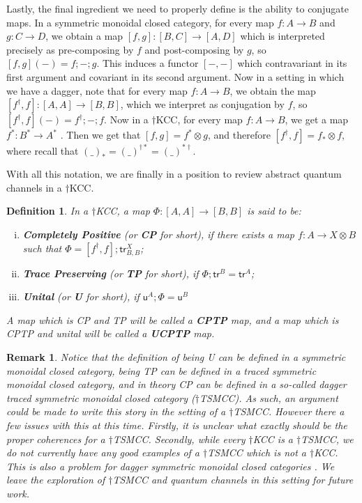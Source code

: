 \documentclass[submission,copyright,creativecommons]{eptcs}
\newtheorem{definition}[observation]{Definition}
\newtheorem{remark}[observation]{Remark}
\begin{document}
Lastly, the final ingredient we need to properly define is the ability to conjugate maps. In a symmetric monoidal closed category, for every map $f: A \to B$ and $g: C \to D$, we obtain a map $[f,g]: [B,C] \to [A,D]$ which is interpreted precisely as pre-composing by $f$ and post-composing by $g$, so $[f,g](-) = f;-;g$. This induces a functor $[-,-]$ which contravariant in its first argument and covariant in its second argument. Now in a setting in which we have a dagger, note that for every map $f: A\to B$, we obtain the map $[f^\dagger, f]: [A,A] \to [B,B]$, which we interpret as conjugation by $f$, so $[f^\dagger, f](-) = f^\dagger; -; f$. Now in a $\dagger$KCC, for every map $f: A \to B$, we get a map $f^\ast: B^\ast \to A^\ast$ \cite[Ex 4.4]{selinger2010survey}. Then we get that $[f,g] = f^\ast \otimes g$, and therefore $[f^\dagger, f] = f_\ast \otimes f$, where recall that $(\_)_\ast = (\_)^{\dagger\ast} = (\_)^{\ast\dagger}$. 

With all this notation, we are finally in a position to review abstract quantum channels in a $\dagger$KCC. 

\begin{definition}\label{Def:UCPTP} In a $\dagger$KCC, a map $\Phi: [A,A] \to [B,B]$ is said to be:
  \begin{enumerate}[(i)]
\item \label{def:CP}\textbf{Completely Positive} \cite[Cor 4.13]{selinger2007dagger} (or \textbf{CP} for short), if there exists a map $f: A \to X \otimes B$ such that $\Phi = [f^\dagger, f]; \mathsf{tr}^X_{B,B}$; 
\item \label{def:TP}\textbf{Trace Preserving} (or \textbf{TP} for short), if $\Phi; \mathsf{tr}^B=\mathsf{tr}^A$; 
\item \label{def:U}\textbf{Unital} (or \textbf{U} for short), if $\mathsf{u}^A;\Phi = \mathsf{u}^B$
\end{enumerate}
A map which is CP and TP will be called a \textbf{CPTP} map, and a map which is CPTP and unital will be called a \textbf{UCPTP} map. 
\end{definition}

\begin{remark} Notice that the definition of being U can be defined in a symmetric monoidal closed category, being TP can be defined in a traced symmetric monoidal closed category, and in theory CP can be defined in a so-called dagger traced symmetric monoidal closed category ($\dagger$TSMCC). As such, an argument could be made to write this story in the setting of a $\dagger$TSMCC. However there a few issues with this at this time. Firstly, it is unclear what exactly should be the proper coherences for a $\dagger$TSMCC. Secondly,   while every $\dagger$KCC is a $\dagger$TSMCC, we do not currently have any good examples of a $\dagger$TSMCC which is not a $\dagger$KCC. This is also a problem for dagger symmetric monoidal closed categories \cite[Sec 9]{heunen2016monads}. We leave the exploration of $\dagger$TSMCC and quantum channels in this setting for future work. 
\end{remark}
\end{document}
